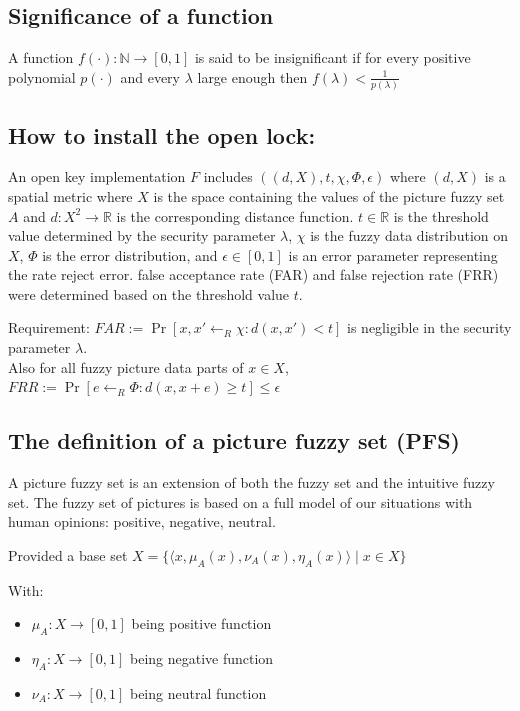 \documentclass[pdflatex,sn-mathphys-num]{sn-jnl}
\theoremstyle{thmstyleone}%
\theoremstyle{thmstyletwo}%
\theoremstyle{thmstylethree}%
\begin{document}
\subsection{Significance of a function}

A function $f(\cdot) : \mathbb{N} \to [0,1]$ is said to be insignificant if for every positive polynomial $p(\cdot)$ and every $\lambda$ large enough then $f(\lambda) < \frac{1}{p(\lambda)}$

\subsection{How to install the open lock:}

An open key implementation $F$ includes $((d, X), t, \chi, \Phi, \epsilon)$ where $(d, X)$ is a spatial metric where $X$ is the space containing the values of the picture fuzzy set $A$ and $d: X^2 \to \mathbb{R}$ is the corresponding distance function. $t \in \mathbb{R}$ is the threshold value determined by the security parameter $\lambda$, $\chi$ is the fuzzy data distribution on $X$, $\Phi$ is the error distribution, and $\epsilon \in [0,1]$ is an error parameter representing the rate reject error. false acceptance rate (FAR) and false rejection rate (FRR) were determined based on the threshold value $t$.

Requirement: $FAR := \Pr[x, x' \leftarrow_R \chi : d(x, x') < t]$ is negligible in the security parameter $\lambda$. \\
Also for all fuzzy picture data parts of $x \in X$, $FRR := \Pr[e \leftarrow_R \Phi : d(x, x + e) \ge t] \le \epsilon$

\subsection{The definition of a picture fuzzy set (PFS)}

A picture fuzzy set is an extension of both the fuzzy set and the intuitive fuzzy set. The fuzzy set of pictures is based on a full model of our situations with human opinions: positive, negative, neutral.

Provided a base set $X = \{ \langle x, \mu_A(x), \nu_A(x), \eta_A(x) \rangle \mid x \in X \}$

With:
\begin{itemize}
    \item $\mu_A: X \to [0, 1]$ being positive function
    \item $\eta_A: X \to [0, 1]$ being negative function
    \item $\nu_A: X \to [0, 1]$ being neutral function
\end{itemize}
\end{document}
